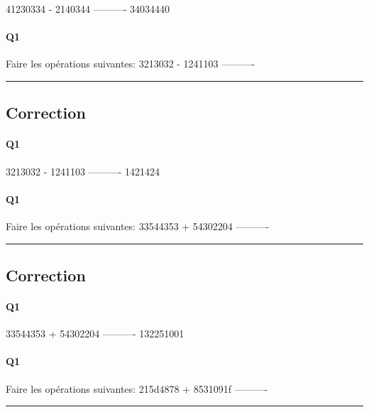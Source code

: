   41230334
-  2140344
----------
  34034440

\pagebreak

\paragraph{Q1}

Faire les opérations suivantes: 
   3213032
-  1241103
----------



\hrule width 1\linewidth
\pagebreak

\subsection{Correction}


\paragraph{Q1}

   3213032
-  1241103
----------
   1421424

\pagebreak

\paragraph{Q1}

Faire les opérations suivantes: 
  33544353
+ 54302204
----------



\hrule width 1\linewidth
\pagebreak

\subsection{Correction}


\paragraph{Q1}

  33544353
+ 54302204
----------
 132251001

\pagebreak

\paragraph{Q1}

Faire les opérations suivantes: 
  215d4878
+ 8531091f
----------



\hrule width 1\linewidth
\pagebreak

